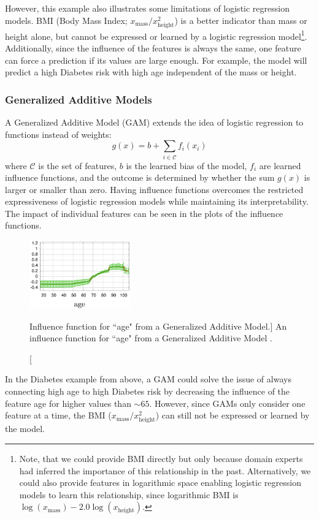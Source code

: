 However, this example also illustrates some limitations of logistic regression models.
BMI (Body Mass Index; $x_\text{mass} / x_\text{height}^2$) is a better indicator than mass or height alone, but cannot be expressed or learned by a logistic regression model\footnote{Note, that we could provide BMI directly but only because domain experts had inferred the importance of this relationship in the past. Alternatively, we could also provide features in logarithmic space enabling logistic regression models to learn this relationship, since logarithmic BMI is $\log{(x_\text{mass})} - 2.0 \log{(x_\text{height})}$.}.
Additionally, since the influence of the features is always the same, one feature can force a prediction if its values are large enough.
For example, the model will predict a high Diabetes risk with high age independent of the mass or height.

\subsubsection{Generalized Additive Models}
A Generalized Additive Model (GAM) extends the idea of logistic regression  to functions instead of weights:
\[
g(x) = b + \sum_{i \in \mathcal{C}} f_i(x_i)
\]
where $\mathcal{C}$ is the set of features, $b$ is the learned bias of the model, $f_i$ are learned influence functions, and the outcome is determined by whether the sum $g(x)$ is larger or smaller than zero.
Having influence functions overcomes the restricted expressiveness of logistic regression models while maintaining its interpretability.
The impact of individual features can be seen in the plots of the influence functions.

\begin{figure}
\centering
\includegraphics[height=8em,valign=t]{tex/introduction/age.png}
\caption[Influence function for ``age" from a Generalized Additive Model.]{
An influence function for ``age" from a Generalized Additive Model \cite{Caruana:2015:IMH:2783258.2788613}.
}
\label{figs:age}
\end{figure}

In the Diabetes example from above, a GAM could solve the issue of always connecting high age to high Diabetes risk by decreasing the influence of the feature age for higher values than ${\sim}65$.
However, since GAMs only consider one feature at a time, the BMI ($x_\text{mass} / x_\text{height}^2$) can still not be expressed or learned by the model.


